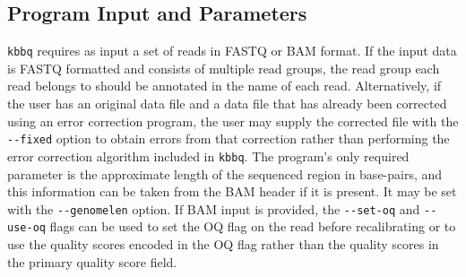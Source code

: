 \documentclass{article}
\begin{document}
\subsection{Program Input and Parameters}
\begin{outline}
	\item \texttt{kbbq} requires as input a set of reads in FASTQ \parencite{cock_sanger_2010} or BAM \parencite{li_sequence_2009} format. If the input data is FASTQ formatted and consists of multiple read groups, the read group each read belongs to should be annotated in the name of each read. Alternatively, if the user has an original data file and a data file that has already been corrected using an error correction program, the user may supply the corrected file with the \texttt{-\phantom{}-fixed} option to obtain errors from that correction rather than performing the error correction algorithm included in \texttt{kbbq}. The program's only required parameter is the approximate length of the sequenced region in base-pairs, and this information can be taken from the BAM header if it is present. It may be set with the \texttt{-\phantom{}-genomelen} option. If BAM input is provided, the \texttt{-\phantom{}-set-oq} and \texttt{-\phantom{}-use-oq} flags can be used to set the OQ flag on the read before recalibrating or to use the quality scores encoded in the OQ flag rather than the quality scores in the primary quality score field.


\end{outline}
\end{document}
